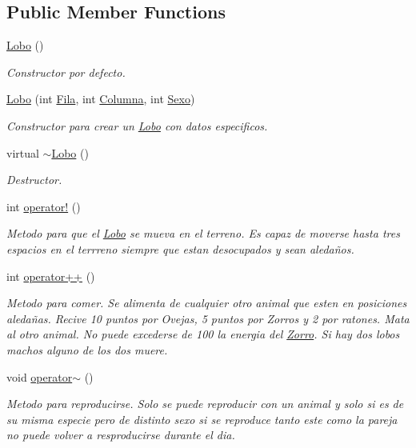 \subsection*{Public Member Functions}
\begin{DoxyCompactItemize}
\item 
\hyperlink{classLobo_a5c6b593887d794ea47abcc7af82a4090}{Lobo} ()
\begin{DoxyCompactList}\small\item\em Constructor por defecto. \end{DoxyCompactList}\item 
\hyperlink{classLobo_a2424bb5ebc7f52b2255b53c8d1560413}{Lobo} (int \hyperlink{classAnimal_ab403adfd13b57143eff123bdd6a2febb}{Fila}, int \hyperlink{classAnimal_a340d64e6e4ffe5f35e0855c63aad1bd3}{Columna}, int \hyperlink{classAnimal_a42b629ae5a7e0c05263a3f6e592ea116}{Sexo})
\begin{DoxyCompactList}\small\item\em Constructor para crear un \hyperlink{classLobo}{Lobo} con datos especificos. \end{DoxyCompactList}\item 
virtual \hyperlink{classLobo_ac3f55f7ba044fc5a20fbcbeed644ce54}{$\sim$\+Lobo} ()
\begin{DoxyCompactList}\small\item\em Destructor. \end{DoxyCompactList}\item 
int \hyperlink{classLobo_aba92fb0575e359e2d66134ab5754ab0d}{operator!} ()
\begin{DoxyCompactList}\small\item\em Metodo para que el \hyperlink{classLobo}{Lobo} se mueva en el terreno. Es capaz de moverse hasta tres espacios en el terrreno siempre que estan desocupados y sean aledaños. \end{DoxyCompactList}\item 
int \hyperlink{classLobo_aa7387ef43eab75b348d85c142f74b2d3}{operator++} ()
\begin{DoxyCompactList}\small\item\em Metodo para comer. Se alimenta de cualquier otro animal que esten en posiciones aledañas. Recive 10 puntos por Ovejas, 5 puntos por Zorros y 2 por ratones. Mata al otro animal. No puede excederse de 100 la energia del \hyperlink{classZorro}{Zorro}. Si hay dos lobos machos alguno de los dos muere. \end{DoxyCompactList}\item 
void \hyperlink{classLobo_a2b4bba4b6d6efa24af4d8e3b986dc7f2}{operator$\sim$} ()
\begin{DoxyCompactList}\small\item\em Metodo para reproducirse. Solo se puede reproducir con un animal y solo si es de su misma especie pero de distinto sexo si se reproduce tanto este como la pareja no puede volver a resproducirse durante el dia. \end{DoxyCompactList}\end{DoxyCompactItemize}
